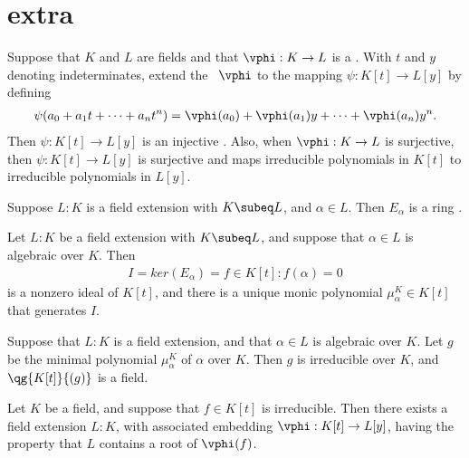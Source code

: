 \documentclass[a4paper]{article}
\begin{document}
\section{extra}
\begin{tproposition}
  Suppose that \( K \) and \( L \) are fields and that \( \vphi : K \to L \) is a \homo. With \( t \) and \( y \) denoting indeterminates, extend the \homo~\( \vphi \) to the mapping \( \psi: K[t] \to L[y] \) by defining \begin{align*}
    \psi(a_0 + a_1t+\cdots + a_n t^n) = \vphi(a_0) + \vphi(a_1)y+\cdots + \vphi(a_n)y^n.
  \end{align*}
  Then \( \psi:K[t]\to L[y] \) is an injective \homo.
  Also, when \( \vphi:K\to L \) is surjective, then \( \psi: K[t]\to L[y] \) is surjective and maps irreducible polynomials in \( K[t] \) to irreducible polynomials in \( L[y] \).
\end{tproposition}

\begin{tproposition}
  Suppose \( L: K \) is a field extension with \( K \subeq L \), and \( \alpha\in L \).  Then \( E_\alpha \) is a ring \homo.
\end{tproposition}

\begin{tproposition}
  Let \( L : K \) be a field extension with \( K \subeq L \), and suppose that \( \alpha\in L \) is algebraic over \( K \).
  Then \begin{align*}
    I = ker(E_\alpha) = {f \in K[t] : f(\alpha) = 0}
  \end{align*}
  is a nonzero ideal of \( K[t] \), and there is a unique monic polynomial \( \mu_\alpha^K \in K[t] \) that generates \( I \).
\end{tproposition}


\begin{ttheorem}
  Suppose that \( L : K \) is a field extension, and that \( \alpha\in L \) is algebraic over \( K \).
  Let \( g \) be the minimal polynomial \( \mu_\alpha^K \) of \( \alpha \) over \( K \).
  Then \( g \) is irreducible over \( K \), and \( \qg{K[t]}{(g)} \) is a field.
\end{ttheorem}

\begin{ttheorem}
  Let \( K \) be a field, and suppose that \( f\in K[t] \) is irreducible.
  Then there exists a field extension \( L:K \), with associated embedding \( \vphi:K[t]\to L[y] \), having the property that \( L \) contains a root of \( \vphi(f) \).
\end{ttheorem}
\end{document}
